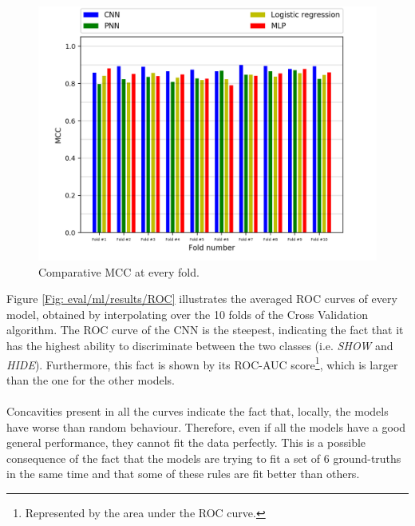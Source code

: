 		\begin{figure}[H]
			\centering
			\includegraphics[width=\textwidth]{graphics/MCC-per-fold}
			\caption{Comparative MCC at every fold.}
			\label{Fig: eval/ml/results/MCC-per-fold}
		\end{figure}
		Figure \ref{Fig: eval/ml/results/ROC} illustrates the averaged ROC curves of every model, obtained by interpolating over the 10 folds of the Cross Validation algorithm. The ROC curve of the CNN is the steepest, indicating the fact that it has the highest ability to discriminate between the two classes (i.e. \textit{SHOW} and \textit{HIDE}). Furthermore, this fact is shown by its ROC-AUC score\footnote{Represented by the area under the ROC curve.}, which is larger than the one for the other models.
		\\ \\
		Concavities present in all the curves indicate the fact that, locally, the models have worse than random behaviour. Therefore, even if all the models have a good general performance, they cannot fit the data perfectly. This is a possible consequence of the fact that the models are trying to fit a set of $6$ ground-truths in the same time and that some of these rules are fit better than others. 
